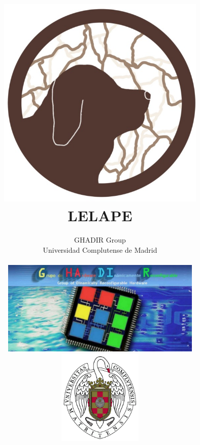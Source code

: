 \documentclass[a4paper,11pt]{book}
\begin{document}
\title{\includegraphics[width=10cm]{fig/LELAPE_LOGO.png}\\ \Huge{\textbf{LELAPE}}}
\author{GHADIR Group \\ Universidad Complutense de Madrid \\ \vspace{1cm}\\  \includegraphics[height=4.5cm]{fig/Ghadir_group.jpg}\hspace{1cm} \includegraphics[width=4cm]{fig/logo_ucm.png}}
\date{}



\frontmatter
\maketitle
\tableofcontents

\mainmatter





\backmatter
\end{document}
